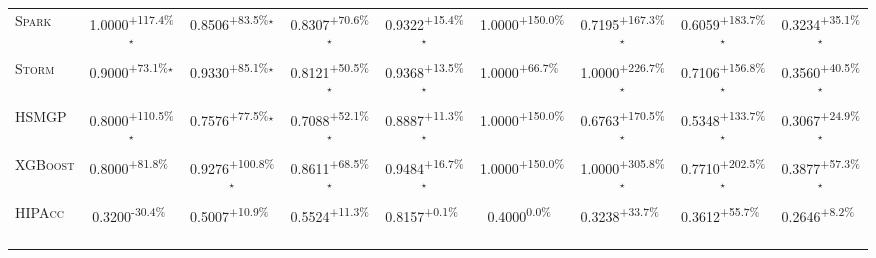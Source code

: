 \begin{table}[htbp]
\begin{tabular}{l|cccc|cccc}
\textsc{Spark} & \cellcolor{green!30}1.0000\textsuperscript{+117.4\%}$^\star$ & \cellcolor{green!30}0.8506\textsuperscript{+83.5\%}$^\star$ & \cellcolor{green!30}0.8307\textsuperscript{+70.6\%}$^\star$ & \cellcolor{green!30}0.9322\textsuperscript{+15.4\%}$^\star$ & \cellcolor{green!30}1.0000\textsuperscript{+150.0\%}$^{\,\,\,}$ & \cellcolor{green!30}0.7195\textsuperscript{+167.3\%}$^\star$ & \cellcolor{green!30}0.6059\textsuperscript{+183.7\%}$^\star$ & \cellcolor{green!30}0.3234\textsuperscript{+35.1\%}$^\star$ \\
\textsc{Storm} & \cellcolor{green!30}0.9000\textsuperscript{+73.1\%}$^\star$ & \cellcolor{green!30}0.9330\textsuperscript{+85.1\%}$^\star$ & \cellcolor{green!30}0.8121\textsuperscript{+50.5\%}$^\star$ & \cellcolor{green!30}0.9368\textsuperscript{+13.5\%}$^\star$ & \cellcolor{green!30}1.0000\textsuperscript{+66.7\%}$^{\,\,\,}$ & \cellcolor{green!30}1.0000\textsuperscript{+226.7\%}$^\star$ & \cellcolor{green!30}0.7106\textsuperscript{+156.8\%}$^\star$ & \cellcolor{green!30}0.3560\textsuperscript{+40.5\%}$^\star$ \\
\textsc{HSMGP} & \cellcolor{green!30}0.8000\textsuperscript{+110.5\%}$^\star$ & \cellcolor{green!30}0.7576\textsuperscript{+77.5\%}$^\star$ & \cellcolor{green!30}0.7088\textsuperscript{+52.1\%}$^\star$ & \cellcolor{green!30}0.8887\textsuperscript{+11.3\%}$^\star$ & \cellcolor{green!30}1.0000\textsuperscript{+150.0\%}$^{\,\,\,}$ & \cellcolor{green!30}0.6763\textsuperscript{+170.5\%}$^\star$ & \cellcolor{green!30}0.5348\textsuperscript{+133.7\%}$^\star$ & \cellcolor{green!30}0.3067\textsuperscript{+24.9\%}$^\star$ \\
\textsc{XGBoost} & \cellcolor{green!30}0.8000\textsuperscript{+81.8\%}$^{\,\,\,}$ & \cellcolor{green!30}0.9276\textsuperscript{+100.8\%}$^\star$ & \cellcolor{green!30}0.8611\textsuperscript{+68.5\%}$^\star$ & \cellcolor{green!30}0.9484\textsuperscript{+16.7\%}$^\star$ & \cellcolor{green!30}1.0000\textsuperscript{+150.0\%}$^{\,\,\,}$ & \cellcolor{green!30}1.0000\textsuperscript{+305.8\%}$^\star$ & \cellcolor{green!30}0.7710\textsuperscript{+202.5\%}$^\star$ & \cellcolor{green!30}0.3877\textsuperscript{+57.3\%}$^\star$ \\
\textsc{HIPAcc} & \cellcolor{red!30}0.3200\textsuperscript{-30.4\%}$^{\,\,\,}$ & \cellcolor{green!30}0.5007\textsuperscript{+10.9\%}$^{\,\,\,}$ & \cellcolor{green!30}0.5524\textsuperscript{+11.3\%}$^{\,\,\,}$ & \cellcolor{green!30}0.8157\textsuperscript{+0.1\%}$^{\,\,\,}$ & \cellcolor{red!30}0.4000\textsuperscript{0.0\%}$^{\,\,\,}$ & \cellcolor{green!30}0.3238\textsuperscript{+33.7\%}$^{\,\,\,}$ & \cellcolor{green!30}0.3612\textsuperscript{+55.7\%}$^{\,\,\,}$ & \cellcolor{green!30}0.2646\textsuperscript{+8.2\%}$^{\,\,\,}$ \\

\end{tabular}
\end{table}
